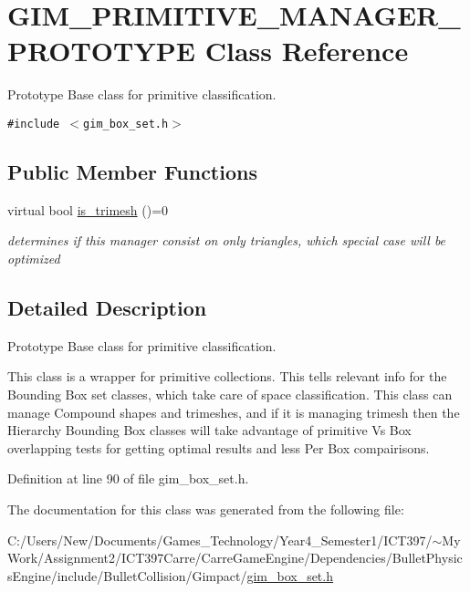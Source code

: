 \hypertarget{class_g_i_m___p_r_i_m_i_t_i_v_e___m_a_n_a_g_e_r___p_r_o_t_o_t_y_p_e}{
\section{GIM\_\-PRIMITIVE\_\-MANAGER\_\-PROTOTYPE Class Reference}
\label{class_g_i_m___p_r_i_m_i_t_i_v_e___m_a_n_a_g_e_r___p_r_o_t_o_t_y_p_e}
}
Prototype Base class for primitive classification.  


{\tt \#include $<$gim\_\-box\_\-set.h$>$}

\subsection*{Public Member Functions}
\begin{CompactItemize}
\item 
\hypertarget{class_g_i_m___p_r_i_m_i_t_i_v_e___m_a_n_a_g_e_r___p_r_o_t_o_t_y_p_e_aad51538aaf2c2652c7e202a9f2d57a5}{
virtual bool \hyperlink{class_g_i_m___p_r_i_m_i_t_i_v_e___m_a_n_a_g_e_r___p_r_o_t_o_t_y_p_e_aad51538aaf2c2652c7e202a9f2d57a5}{is\_\-trimesh} ()=0}
\label{class_g_i_m___p_r_i_m_i_t_i_v_e___m_a_n_a_g_e_r___p_r_o_t_o_t_y_p_e_aad51538aaf2c2652c7e202a9f2d57a5}

\begin{CompactList}\small\item\em determines if this manager consist on only triangles, which special case will be optimized \item\end{CompactList}\end{CompactItemize}


\subsection{Detailed Description}
Prototype Base class for primitive classification. 

This class is a wrapper for primitive collections. This tells relevant info for the Bounding Box set classes, which take care of space classification. This class can manage Compound shapes and trimeshes, and if it is managing trimesh then the Hierarchy Bounding Box classes will take advantage of primitive Vs Box overlapping tests for getting optimal results and less Per Box compairisons. 

Definition at line 90 of file gim\_\-box\_\-set.h.

The documentation for this class was generated from the following file:\begin{CompactItemize}
\item 
C:/Users/New/Documents/Games\_\-Technology/Year4\_\-Semester1/ICT397/$\sim$My Work/Assignment2/ICT397Carre/CarreGameEngine/Dependencies/BulletPhysicsEngine/include/BulletCollision/Gimpact/\hyperlink{gim__box__set_8h}{gim\_\-box\_\-set.h}\end{CompactItemize}
